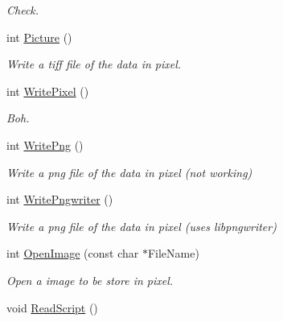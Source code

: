 \begin{DoxyCompactItemize}
\begin{DoxyCompactList}\small\item\em \-Check. \end{DoxyCompactList}\item 
\hypertarget{classDraw_a45ed15a0527d5ba75107645dc8467078}{int \hyperlink{classDraw_a45ed15a0527d5ba75107645dc8467078}{\-Picture} ()}\label{classDraw_a45ed15a0527d5ba75107645dc8467078}

\begin{DoxyCompactList}\small\item\em \-Write a tiff file of the data in pixel. \end{DoxyCompactList}\item 
\hypertarget{classDraw_a289d8cd3100d77331ac7879eedcfcad0}{int \hyperlink{classDraw_a289d8cd3100d77331ac7879eedcfcad0}{\-Write\-Pixel} ()}\label{classDraw_a289d8cd3100d77331ac7879eedcfcad0}

\begin{DoxyCompactList}\small\item\em \-Boh. \end{DoxyCompactList}\item 
\hypertarget{classDraw_a0b5ba668037c62f126f6d480048f9087}{int \hyperlink{classDraw_a0b5ba668037c62f126f6d480048f9087}{\-Write\-Png} ()}\label{classDraw_a0b5ba668037c62f126f6d480048f9087}

\begin{DoxyCompactList}\small\item\em \-Write a png file of the data in pixel (not working) \end{DoxyCompactList}\item 
\hypertarget{classDraw_a46f9540fd46154cbfd9669ac414dbe2a}{int \hyperlink{classDraw_a46f9540fd46154cbfd9669ac414dbe2a}{\-Write\-Pngwriter} ()}\label{classDraw_a46f9540fd46154cbfd9669ac414dbe2a}

\begin{DoxyCompactList}\small\item\em \-Write a png file of the data in pixel (uses libpngwriter) \end{DoxyCompactList}\item 
\hypertarget{classDraw_a2e01e34ba6507a931ca7535f99c26347}{int \hyperlink{classDraw_a2e01e34ba6507a931ca7535f99c26347}{\-Open\-Image} (const char $\ast$\-File\-Name)}\label{classDraw_a2e01e34ba6507a931ca7535f99c26347}

\begin{DoxyCompactList}\small\item\em \-Open a image to be store in pixel. \end{DoxyCompactList}\item 
\hypertarget{classDraw_ad84f29894ee58a4e931cdbc41ba7a9d2}{void \hyperlink{classDraw_ad84f29894ee58a4e931cdbc41ba7a9d2}{\-Read\-Script} ()}\label{classDraw_ad84f29894ee58a4e931cdbc41ba7a9d2}


\end{DoxyCompactItemize}
